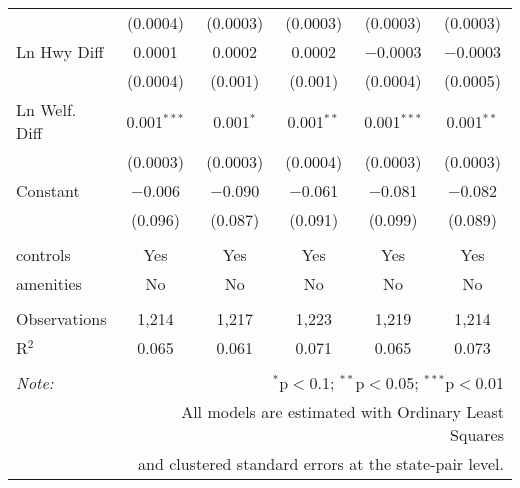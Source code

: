 \begin{table}[!htbp]
\begin{tabular}{@{\extracolsep{5pt}}lccccc}
  & (0.0004) & (0.0003) & (0.0003) & (0.0003) & (0.0003) \\ 
  Ln Hwy Diff & 0.0001 & 0.0002 & 0.0002 & $-$0.0003 & $-$0.0003 \\ 
  & (0.0004) & (0.001) & (0.001) & (0.0004) & (0.0005) \\ 
  Ln Welf. Diff & 0.001$^{***}$ & 0.001$^{*}$ & 0.001$^{**}$ & 0.001$^{***}$ & 0.001$^{**}$ \\ 
  & (0.0003) & (0.0003) & (0.0004) & (0.0003) & (0.0003) \\ 
  Constant & $-$0.006 & $-$0.090 & $-$0.061 & $-$0.081 & $-$0.082 \\ 
  & (0.096) & (0.087) & (0.091) & (0.099) & (0.089) \\ 
 \hline \\[-1.8ex] 
controls & Yes & Yes & Yes & Yes & Yes \\ 
amenities & No & No & No & No & No \\ 
\hline \\[-1.8ex] 
Observations & 1,214 & 1,217 & 1,223 & 1,219 & 1,214 \\ 
R$^{2}$ & 0.065 & 0.061 & 0.071 & 0.065 & 0.073 \\ 
\hline 
\hline \\[-1.8ex] 
\textit{Note:}  & \multicolumn{5}{r}{$^{*}$p$<$0.1; $^{**}$p$<$0.05; $^{***}$p$<$0.01} \\ 
 & \multicolumn{5}{r}{All models are estimated with Ordinary Least Squares} \\ 
 & \multicolumn{5}{r}{and clustered standard errors at the state-pair level.} \\ 
\end{tabular} 
\end{table} 
